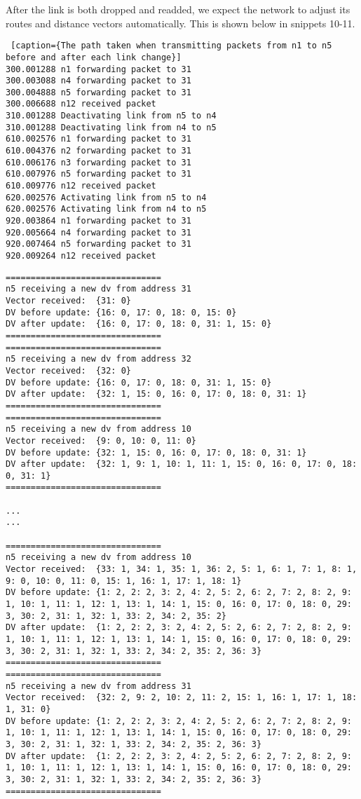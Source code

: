 \documentclass[11pt]{article}
\begin{document}
After the link is both dropped and readded, we expect the network to adjust its routes and distance vectors automatically. This is shown below in snippets 10-11.

 \begin{lstlisting} [caption={The path taken when transmitting packets from n1 to n5 before and after each link change}]
300.001288 n1 forwarding packet to 31
300.003088 n4 forwarding packet to 31
300.004888 n5 forwarding packet to 31
300.006688 n12 received packet
310.001288 Deactivating link from n5 to n4
310.001288 Deactivating link from n4 to n5
610.002576 n1 forwarding packet to 31
610.004376 n2 forwarding packet to 31
610.006176 n3 forwarding packet to 31
610.007976 n5 forwarding packet to 31
610.009776 n12 received packet
620.002576 Activating link from n5 to n4
620.002576 Activating link from n4 to n5
920.003864 n1 forwarding packet to 31
920.005664 n4 forwarding packet to 31
920.007464 n5 forwarding packet to 31
920.009264 n12 received packet

\end{lstlisting}

 \begin{lstlisting} 
===============================
n5 receiving a new dv from address 31
Vector received:  {31: 0}
DV before update: {16: 0, 17: 0, 18: 0, 15: 0}
DV after update:  {16: 0, 17: 0, 18: 0, 31: 1, 15: 0}
===============================
===============================
n5 receiving a new dv from address 32
Vector received:  {32: 0}
DV before update: {16: 0, 17: 0, 18: 0, 31: 1, 15: 0}
DV after update:  {32: 1, 15: 0, 16: 0, 17: 0, 18: 0, 31: 1}
===============================
===============================
n5 receiving a new dv from address 10
Vector received:  {9: 0, 10: 0, 11: 0}
DV before update: {32: 1, 15: 0, 16: 0, 17: 0, 18: 0, 31: 1}
DV after update:  {32: 1, 9: 1, 10: 1, 11: 1, 15: 0, 16: 0, 17: 0, 18: 0, 31: 1}
===============================

...
...

===============================
n5 receiving a new dv from address 10
Vector received:  {33: 1, 34: 1, 35: 1, 36: 2, 5: 1, 6: 1, 7: 1, 8: 1, 9: 0, 10: 0, 11: 0, 15: 1, 16: 1, 17: 1, 18: 1}
DV before update: {1: 2, 2: 2, 3: 2, 4: 2, 5: 2, 6: 2, 7: 2, 8: 2, 9: 1, 10: 1, 11: 1, 12: 1, 13: 1, 14: 1, 15: 0, 16: 0, 17: 0, 18: 0, 29: 3, 30: 2, 31: 1, 32: 1, 33: 2, 34: 2, 35: 2}
DV after update:  {1: 2, 2: 2, 3: 2, 4: 2, 5: 2, 6: 2, 7: 2, 8: 2, 9: 1, 10: 1, 11: 1, 12: 1, 13: 1, 14: 1, 15: 0, 16: 0, 17: 0, 18: 0, 29: 3, 30: 2, 31: 1, 32: 1, 33: 2, 34: 2, 35: 2, 36: 3}
===============================
===============================
n5 receiving a new dv from address 31
Vector received:  {32: 2, 9: 2, 10: 2, 11: 2, 15: 1, 16: 1, 17: 1, 18: 1, 31: 0}
DV before update: {1: 2, 2: 2, 3: 2, 4: 2, 5: 2, 6: 2, 7: 2, 8: 2, 9: 1, 10: 1, 11: 1, 12: 1, 13: 1, 14: 1, 15: 0, 16: 0, 17: 0, 18: 0, 29: 3, 30: 2, 31: 1, 32: 1, 33: 2, 34: 2, 35: 2, 36: 3}
DV after update:  {1: 2, 2: 2, 3: 2, 4: 2, 5: 2, 6: 2, 7: 2, 8: 2, 9: 1, 10: 1, 11: 1, 12: 1, 13: 1, 14: 1, 15: 0, 16: 0, 17: 0, 18: 0, 29: 3, 30: 2, 31: 1, 32: 1, 33: 2, 34: 2, 35: 2, 36: 3}
===============================
\end{lstlisting}
\end{document}
